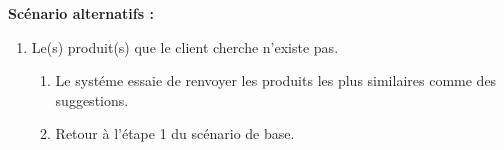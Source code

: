 \textbf{Scénario alternatifs : }
\begin{enumerate}
	\item Le(s) produit(s) que le client cherche n'existe pas.
	      \begin{enumerate}
		      \item Le systéme essaie de renvoyer les produits les plus similaires comme des suggestions.
		      \item Retour à l'étape 1 du scénario de base.
	      \end{enumerate}
\end{enumerate}